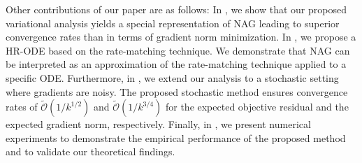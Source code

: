 \documentclass{article}
\theoremstyle{plain}
\theoremstyle{definition}
\theoremstyle{remark}
\newcommand{\aynote}[1]{\textcolor{red}{[\textbf{Note:} #1]}}
\begin{document}



Other contributions of our paper are as follows: 
In , we show that our proposed variational analysis yields a special representation of NAG leading to superior convergence rates than \citep{shi2019acceleration} in terms of gradient norm minimization. 
In , we propose a HR-ODE based on the rate-matching technique. We demonstrate that NAG can be interpreted as an approximation of the rate-matching technique applied to a specific ODE. 
Furthermore, in , we extend our analysis to a stochastic setting where gradients are noisy. The proposed stochastic method ensures convergence rates of $\tilde{\mathcal{O}}(1/k^{1/2})$ and $\tilde{\mathcal{O}}(1/k^{3/4})$ for the expected objective residual and the expected gradient norm, respectively. 
Finally, in , we present numerical experiments to demonstrate the empirical performance of the proposed method and to validate our theoretical findings. 
\end{document}
